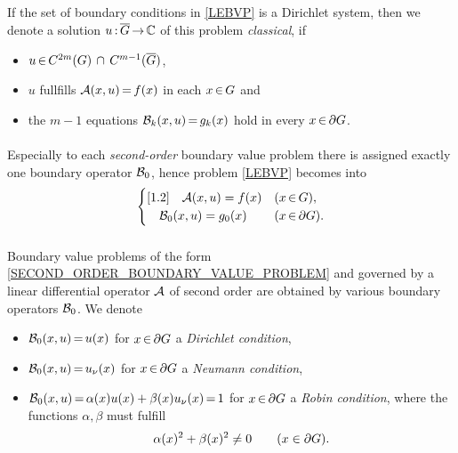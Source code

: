 \documentclass[11pt,twoside]{article}
\def\G{G}
\begin{document}
\subparagraph{} %
If the set of boundary conditions in \eqref{LEBVP} is a Dirichlet system,
then we denote a solution $u \: \clG \xto \C$
of this problem \textit{classical},
if
\begin{itemize}[leftmargin=9mm]
\item[(a)] $u \xeof C^{2m}(\G) \, \cap \, C^{m-1}(\clG)$,
\item[(b)] $u$ fullfills ${\mathcal{A}}(x,u) {\,=\,} f(x)$ in each $x {\,\in\,} G$ and
\item[(c)] the $m{-}1$ equations ${\mathcal{B}}_k(x,u) {\,=\,} g_k(x)$ hold
           in every $x \xeof \bndG$.
\end{itemize}

\paragraph{} %
Especially to each \textit{second-order} boundary value problem
there is assigned exactly one boundary operator ${\mathcal{B}}_0$,
hence problem \eqref{LEBVP} becomes into
\begin{equation}\label{SECOND_ORDER_BOUNDARY_VALUE_PROBLEM}
\begin{cases}[1.2]
\quad \A(x,u)     = f(x)   & (x \xeof \G),\\
\quad \BDO_0(x,u) = g_0(x) & (x \xeof \bndG).\\
\end{cases}
\end{equation}

\subparagraph{} %
Boundary value problems of the form \eqref{SECOND_ORDER_BOUNDARY_VALUE_PROBLEM}
and governed by a linear differential operator ${\mathcal{A}}$ of second order
are obtained by various boundary operators ${\mathcal{B}}_0$.
We denote

\begin{itemize}[leftmargin=18mm,itemsep=2pt]
\item[(BC-1)]
\;${\mathcal{B}}_0(x,u) {\,=\,} u(x)$ for $x \xeof \bndG$ a \textit{Dirichlet condition},

\item[(BC-2)]
\;${\mathcal{B}}_0(x,u) {\,=\,} u_{\nu}(x)$ for $x \xeof \bndG$ a \textit{Neumann condition},

\item[(BC-3)]
\;${\mathcal{B}}_0(x,u) {\,=\,} \alpha(x)u(x)+\beta(x) u_{\nu}(x) {\,=\,} 1$ for $x \xeof \bndG$ 
a \textit{Robin condition},
where the functions $\alpha, \beta$ must fulfill 
\[
\alpha(x)^2 + \beta(x)^2 \neq 0 \quad \quad (x \in \bndG).
\]
\end{itemize}
\end{document}
